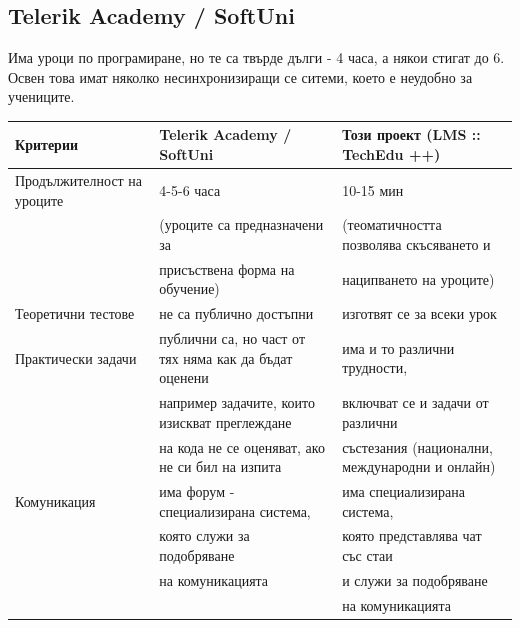 \documentclass[12pt]{article}
\begin{document}
	\subsection{Telerik Academy / SoftUni}
	Има уроци по програмиране, но те са твърде дълги - 4 часа, а някои стигат до 6. Освен това имат няколко несинхронизиращи се ситеми, което е неудобно за учениците.
	\begin{table}[ht]
	\centering
	\resizebox{\textwidth}{!}
	{
		\begin{tabular}{l|l|l}
			Критерии & Telerik Academy / SoftUni & Този проект (LMS :: TechEdu ++)\\
			\hline
			Продължителност на уроците & 4-5-6 часа & 10-15 мин\\
			&(уроците са предназначени за&(теоматичността позволява скъсяването и \\
			&присъствена форма на обучение)& наципването на уроците)\\
			\hline
			Теоретични тестове & не са публично достъпни & изготвят се за всеки урок\\
			\hline
			Практически задачи & публични са, но част от тях няма как да бъдат оценени & има и то различни трудности,\\
			& например задачите, които изискват преглеждане& включват се и задачи от различни \\
			& на кода не се оценяват, ако не си бил на изпита & състезания (национални, международни и онлайн)\\
			\hline
			Комуникация & има форум - специализирана система, & има специализирана система,\\
			&която служи за подобряване& която представлява чат със стаи \\
			&на комуникацията & и служи за подобряване\\
			& & на комуникацията\\
			\hline
		\end{tabular}
	}
	\end{table}\\
\end{document}
